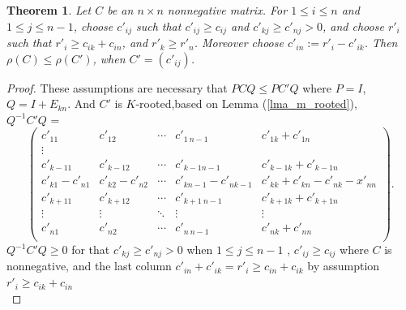 \documentclass{article}
\theoremstyle{plain}
\newtheorem{thm}{Theorem}[section]
\theoremstyle{definition}
\begin{document}
\begin{thm}\label{thm:conclusion}
    Let $C$ be an $n\times n$ nonnegative matrix. For $1\leq i \leq n$ and $1\leq j\leq n-1$, choose $c'_{ij}$
    such that $c'_{ij}\geq c_{ij}$ and $c'_{kj}\geq c'_{nj}>0$, and choose $r'_i$ such that $r'_i\geq c_{ik}+c_{in}$, and
    $r'_k \geq r'_n$. Moreover choose $c'_{in}:=r'_i-c'_{ik}$. Then $\rho(C)\leq \rho(C')$, when $C'=(c'_{ij})$.
\end{thm}

\begin{proof}
    These assumptions are necessary that $PCQ \leq PC'Q$ where $P = I$,$Q = I+E_{kn}$. And $C'$ is $K$-rooted,based on Lemma
     (\ref{lma_m_rooted}),\\
    $Q^{-1}C'Q$ = 
    $$\begin{pmatrix}
        c'_{11}     & c'_{12} & \cdots     & c'_{1\ n-1} & c'_{1k}+c'_{1n} \\
        \vdots \\
        c'_{k-11}     & c'_{k-1 2}           & \cdots     & c'_{k-1 n-1} & c'_{k-1k}+c'_{k-1n} \\
        c'_{k1}-c'_{n1} & c'_{k2}-c'_{n2} &\cdots      &c'_{kn-1}-c'_{nk-1}& c'_{kk}+c'_{kn}-c'_{nk}-x'_{nn}\\
        c'_{k+11}     & c'_{k+12}           & \cdots     & c'_{k+1\ n-1} & c'_{k+1k}+c'_{k+1n} \\
        \vdots              & \vdots & \ddots              & \vdots & \vdots \\
        c'_{n1}             & c'_{n2} & \cdots             & c'_{n\ n-1} & c'_{nk}+c'_{nn} \\
    \end{pmatrix}.$$
    $Q^{-1}C'Q \geq 0$ for that $c'_{kj}\geq c'_{nj}>0$ when $1\leq j\leq n-1$ , $c'_{ij}\geq c_{ij}$ where $C$ is nonnegative,
    and the last column $c'_{in}+c'_{ik}=r'_i \geq c_{in}+c_{ik}$ by assumption $r'_i\geq c_{ik}+c_{in}$\\


\end{proof}
\end{document}

